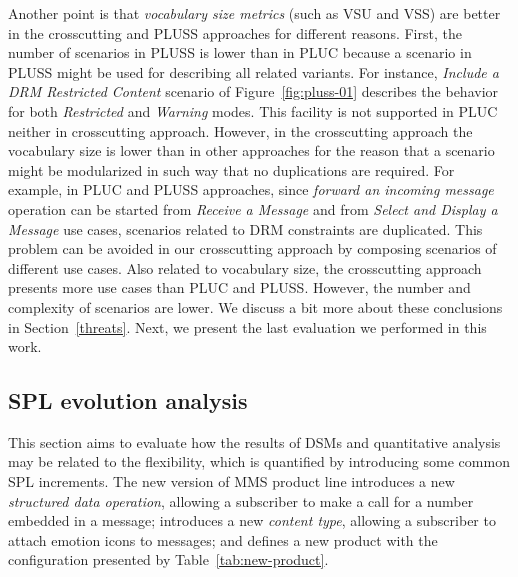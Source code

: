 \documentclass{acm_proc_article-sp}
\begin{document}
Another point is that \emph{vocabulary size metrics} (such as VSU and VSS) are better in the crosscutting and PLUSS approaches for different reasons. First, the number of scenarios in PLUSS is lower than in PLUC because a scenario in PLUSS might be used for describing all related variants. For instance, \emph{Include a DRM Restricted Content} scenario of Figure~\ref{fig:pluss-01} describes the behavior for both \emph{Restricted} and \emph{Warning} modes. This facility is not supported in PLUC neither in crosscutting approach. However, in the crosscutting approach the vocabulary size is lower than in other approaches for the reason that a scenario might be modularized in such way that no duplications are required. For example, in PLUC and PLUSS approaches, since \emph{forward an incoming message} operation can be started from \emph{Receive a Message} and from \emph{Select and Display a Message} use cases, scenarios related to DRM constraints are duplicated. This problem can be avoided in our crosscutting approach by composing scenarios of different use cases.  
Also related to vocabulary size, the crosscutting approach presents more use cases than PLUC and PLUSS. However, 
the number and complexity of scenarios are lower. We discuss a bit more about these conclusions in Section~\ref{threats}. Next, 
we present the last evaluation we performed in this work.
%


\subsection{SPL evolution analysis}
\label{evolution-analysis}

This section aims to evaluate how the results of DSMs and quantitative analysis may be related 
to the flexibility, which is quantified by introducing some common SPL increments. The new version of MMS 
product line introduces a new \emph{structured data operation}, allowing a subscriber to make 
a call for a number embedded in a message;  introduces a new \emph{content type}, allowing a subscriber 
to attach emotion icons to messages; and defines a new product with the configuration presented by Table~\ref{tab:new-product}.
\end{document}
